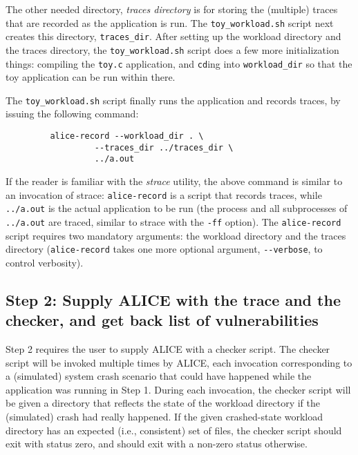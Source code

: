 \documentclass[oneside]{memoir}
\begin{document}
The other needed directory, \textit{traces directory} is for storing the (multiple) traces that are recorded as the application is run. The \verb;toy_workload.sh; script next creates this directory, \verb;traces_dir;. After setting up the workload directory and the traces directory, the \verb;toy_workload.sh; script does a few more initialization things: compiling the \verb;toy.c; application, and \verb;cd;ing into \verb;workload_dir; so that the toy application can be run within there.

The \verb;toy_workload.sh; script finally runs the application and records traces, by issuing the following command:

\begin{verbatim}
         alice-record --workload_dir . \
                  --traces_dir ../traces_dir \
                  ../a.out
\end{verbatim}

If the reader is familiar with the \textit{strace} utility, the above command is similar to an invocation of strace: \verb;alice-record; is a script that records traces, while \verb;../a.out; is the actual application to be run (the process and all subprocesses of \verb;../a.out; are traced, similar to strace with the \verb;-ff; option). The \verb;alice-record; script requires two mandatory arguments: the workload directory and the traces directory (\verb;alice-record; takes one more optional argument, \verb;--verbose;, to control verbosity).

\subsection{Step 2: Supply ALICE with the trace and the checker, and get back list of vulnerabilities}
\textmd{Step 2} requires the user to supply ALICE with a checker script. The checker script will be invoked multiple times by ALICE, each invocation corresponding to a (simulated) system crash scenario that could have happened while the application was running in \textmd{Step 1}. During each invocation, the checker script will be given a directory that reflects the state of the workload directory if the (simulated) crash had really happened. If the given crashed-state workload directory has an expected (i.e., consistent) set of files, the checker script should exit with status zero, and should exit with a non-zero status otherwise.
\end{document}
